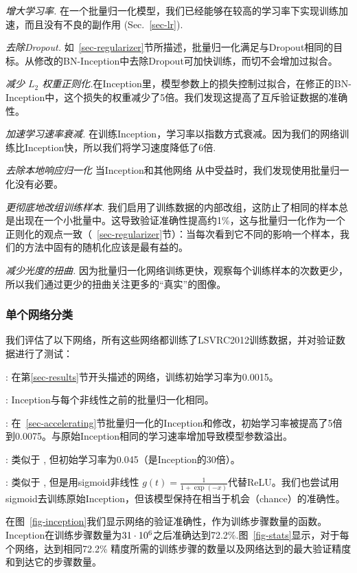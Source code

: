 \documentclass[twocolumn]{article}
\begin{document}
{\em 增大学习率.} 在一个批量归一化模型，我们已经能够在较高的学习率下实现训练加速，而且没有不良的副作用 (Sec.~\ref{sec-lr}).

 {\em 去除Dropout.} 如~\ref{sec-regularizer}节所描述，批量归一化满足与Dropout相同的目标。从修改的BN-Inception中去除Dropout可加快训练，而切不会增加过拟合。
 
{\em 减少 $L_2$ 权重正则化.}在Inception里，模型参数上的损失控制过拟合，在修正的BN-Inception中，这个损失的权重减少了5倍。我们发现这提高了互斥验证数据的准确性。

{\em 加速学习速率衰减.} 
在训练Inception，学习率以指数方式衰减。因为我们的网络训练比Inception快，所以我们将学习速度降低了6倍.

{\em 去除本地响应归一化}   当Inception和其他网络 \cite{dropout} 从中受益时，我们发现使用批量归一化没有必要。

{\em 更彻底地改组训练样本.} 
我们启用了训练数据的内部改组，这防止了相同的样本总是出现在一个小批量中。这导致验证准确性提高约1\%，这与批量归一化作为一个正则化的观点一致（~\ref{sec-regularizer}节）：当每次看到它不同的影响一个样本，我们的方法中固有的随机化应该是最有益的。

{\em 减少光度的扭曲.}
因为批量归一化网络训练更快，观察每个训练样本的次数更少，所以我们通过更少的扭曲关注更多的“真实”的图像。

\subsubsection{单个网络分类}
我们评估了以下网络，所有这些网络都训练了LSVRC2012训练数据，并对验证数据进行了测试：

: 在第\ref{sec-results}节开头描述的网络，训练初始学习率为0.0015。

: Inception与每个非线性之前的批量归一化相同。

: 在~\ref{sec-accelerating}节批量归一化的Inception和修改，初始学习率被提高了5倍到0.0075。与原始Inception相同的学习速率增加导致模型参数溢出。

: 类似于 , 但初始学习率为0.045（是Inception的30倍）。

: 类似于 , 但是用sigmoid非线性 $g(t)=\frac{1}{1+\exp(-x)}$代替ReLU。我们也尝试用sigmoid去训练原始Inception，但该模型保持在相当于机会（chance）的准确性。

在图~\ref{fig-inception}我们显示网络的验证准确性，作为训练步骤数量的函数。Inception在训练步骤数量为$31\cdot 10^6$之后准确达到72.2\%.图~\ref{fig-stats}显示，对于每个网络，达到相同72.2\% 精度所需的训练步骤的数量以及网络达到的最大验证精度和到达它的步骤数量。
\end{document}
